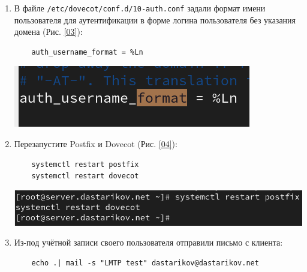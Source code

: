 \begin{enumerate}
\item В файле \texttt{/etc/dovecot/conf.d/10-auth.conf} задали формат имени пользователя для аутентификации в форме логина пользователя без указания домена (Рис. \ref{03}):
  \begin{verbatim}
    auth_username_format = %Ln
  \end{verbatim}
\begin{center}
    \centering
    \includegraphics[width=\textwidth]{../images/image03.png}
    \label{03}
\end{center}
\item Перезапустите Postfix и Dovecot (Рис. \ref{04}):
  \begin{verbatim}
    systemctl restart postfix
    systemctl restart dovecot
  \end{verbatim}
\begin{center}
    \centering
    \includegraphics[width=\textwidth]{../images/image04.png}
    \label{04}
\end{center}
\item Из-под учётной записи своего пользователя отправили письмо с клиента:
  \begin{verbatim}
    echo .| mail -s "LMTP test" dastarikov@dastarikov.net
  \end{verbatim}


\end{enumerate}
